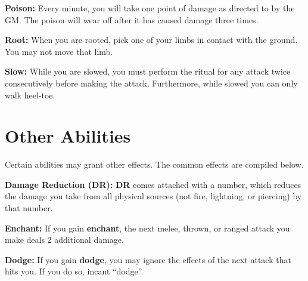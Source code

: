 \documentclass[green]{grimrock}
\begin{document}
{\bf Poison:}  Every minute, you will take one point of damage as directed to by the GM.  The poison will wear off after it has caused damage three times.

{\bf Root:} When you are rooted, pick one of your  limbs in contact with the ground.  You may not move that limb.

{\bf Slow:} While you are slowed, you must perform the ritual for any attack twice consecutively before making the attack. Furthermore, while slowed you can only walk heel-toe.

\section{Other Abilities}

Certain abilities may grant other effects.  The common effects are compiled below.

{\bf Damage Reduction (DR):} {\bf DR} comes attached with a number, which reduces the damage you take from all physical sources (not fire, lightning, or piercing) by that number.

{\bf Enchant:} If you gain {\bf enchant}, the next melee, thrown, or ranged attack you make deals 2 additional damage.

{\bf Dodge:} If you gain {\bf dodge}, you may ignore the effects of the next attack that hits you.  If you do so, incant ``dodge''.



\end{document}
